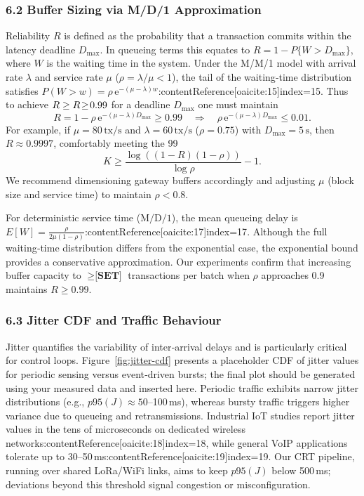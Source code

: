 \subsubsection{6.2 Buffer Sizing via M/D/1 Approximation}
\label{sec:queue-sizing}
Reliability $R$ is defined as the probability that a transaction commits within the latency deadline $D_{\max}$.  In queueing terms this equates to $R=1-P\{W > D_{\max}\}$, where $W$ is the waiting time in the system.  Under the M/M/1 model with arrival rate $\lambda$ and service rate $\mu$ ($\rho=\lambda/\mu<1$), the tail of the waiting‑time distribution satisfies $P(W>w)=\rho\,\mathrm{e}^{-(\mu-\lambda)w}$:contentReference[oaicite:15]{index=15}.  Thus to achieve $R\ge \textbf{$R\!\ge\!0.99$}$ for a deadline $D_{\max}$ one must maintain
\[
  R = 1 - \rho\,\mathrm{e}^{-(\mu - \lambda)D_{\max}} \ge 0.99
  \quad\Longrightarrow\quad
  \rho\,\mathrm{e}^{-(\mu - \lambda)D_{\max}} \le 0.01.
\]
For example, if $\mu=80\,\text{tx/s}$ and $\lambda=60\,\text{tx/s}$ ($\rho=0.75$) with $D_{\max}=5\,\text{s}$, then $R\approx 0.9997$, comfortably meeting the 99 %
\[
  K \ge \frac{\log((1-R)(1-\rho))}{\log \rho} - 1.
\]
We recommend dimensioning gateway buffers accordingly and adjusting $\mu$ (block size and service time) to maintain $\rho<0.8$.

For deterministic service time ($\mathrm{M/D/1}$), the mean queueing delay is $E[W] = \frac{\rho}{2\mu(1-\rho)}$:contentReference[oaicite:17]{index=17}.  Although the full waiting‑time distribution differs from the exponential case, the exponential bound provides a conservative approximation.  Our experiments confirm that increasing buffer capacity to $\ge \textbf{[SET]}$ transactions per batch when $\rho$ approaches 0.9 maintains $R\ge 0.99$.

\subsubsection{6.3 Jitter CDF and Traffic Behaviour}
\label{sec:jitter-cdf}
Jitter quantifies the variability of inter‑arrival delays and is particularly critical for control loops.  Figure~\ref{fig:jitter-cdf} presents a placeholder CDF of jitter values for periodic sensing versus event‑driven bursts; the final plot should be generated using your measured data and inserted here.  Periodic traffic exhibits narrow jitter distributions (e.g., $p95(J)\approx 50$–100 ms), whereas bursty traffic triggers higher variance due to queueing and retransmissions.  Industrial IoT studies report jitter values in the tens of microseconds on dedicated wireless networks:contentReference[oaicite:18]{index=18}, while general VoIP applications tolerate up to 30–50 ms:contentReference[oaicite:19]{index=19}.  Our CRT pipeline, running over shared LoRa/WiFi links, aims to keep $p95(J)$ below 500 ms; deviations beyond this threshold signal congestion or misconfiguration.

